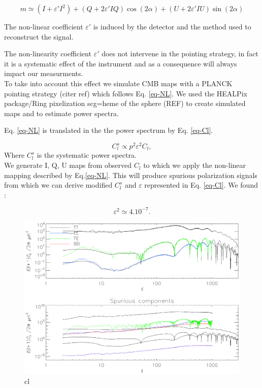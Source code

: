 \begin{equation}
m  \simeq (I + \varepsilon' I^{2}) + (Q + 2\varepsilon' IQ) \cos(2\alpha) + (U + 2 \varepsilon' IU) \sin(2\alpha)
\label{eq-NL}
\end{equation}

The non-linear coefficient $\varepsilon'$ is induced by the detector and the method used to reconstruct the signal.

The non-linearity coefficient $\varepsilon'$ does not intervene in the pointing strategy, in fact it is a systematic effect of the instrument and as a consequence will always impact our measurments. \\
To take into account this effect we simulate CMB maps with a PLANCK pointing strategy (citer ref) which follows Eq. \ref{eq-NL}. We used the HEALPix package/Ring pixelization scg=heme of the sphere (REF) to create simulated maps and to estimate power spectra.


Eq. \ref{eq-NL} is translated in the the power spectrum by Eq. \ref{eq-Cl}.

\begin{equation}
C_{l}^{s} \propto p^{2} \varepsilon^{2} C_{l},
\label{eq-Cl}
\end{equation}
Where $C_{l}^{s}$ is the systematic power spectra.\\

We generate I, Q, U maps from observed $C_{l}$ to which we apply the non-linear mapping described by Eq.\ref{eq-NL}. This will produce spurious polarization signals from which we can derive modified $C_{l}^{s}$ and $\varepsilon$ represented in Eq. \ref{eq-Cl}. We found :

\begin{equation}
\varepsilon^{2} \simeq 4.10^{-7}.
\label{epsilon}
\end{equation}

\begin{figure}[h]
\center
	\includegraphics[scale=0.55]{Figures/cl.eps}
	\caption{cl}
	\label{fig:cl}
\end{figure}

